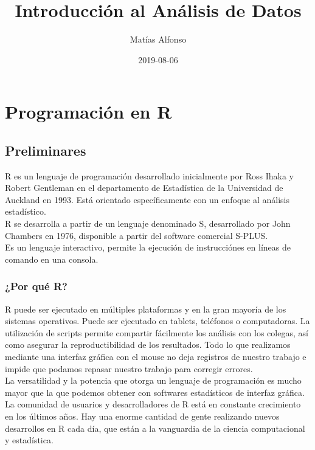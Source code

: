 \documentclass[spanish,]{book}
\title{Introducción al Análisis de Datos}
\author{Matías Alfonso}
\date{2019-08-06}
\begin{document}
\maketitle

{
\setcounter{tocdepth}{1}
\tableofcontents
}
\part{Programación en R}\label{part-programacion-en-r}

\chapter{Preliminares}\label{prelim}

R es un lenguaje de programación desarrollado inicialmente por Ross
Ihaka y Robert Gentleman en el departamento de Estadística de la
Universidad de Auckland en 1993. Está orientado específicamente con un
enfoque al análisis estadístico.\\
R se desarrolla a partir de un lenguaje denominado S, desarrollado por
John Chambers en 1976, disponible a partir del software comercial
S-PLUS.\\
Es un lenguaje interactivo, permite la ejecución de instrucciónes en
líneas de comando en una consola.

\section{¿Por qué R?}\label{por-que-r}

R puede ser ejecutado en múltiples plataformas y en la gran mayoría de
los sistemas operativos. Puede ser ejecutado en tablets, teléfonos o
computadoras. La utilización de scripts permite compartir fácilmente los
análisis con los colegas, así como asegurar la reproductibilidad de los
resultados. Todo lo que realizamos mediante una interfaz gráfica con el
mouse no deja registros de nuestro trabajo e impide que podamos repasar
nuestro trabajo para corregir errores.\\
La versatilidad y la potencia que otorga un lenguaje de programación es
mucho mayor que la que podemos obtener con softwares estadísticos de
interfaz gráfica.\\
La comunidad de usuarios y desarrolladores de R está en constante
crecimiento en los últimos años. Hay una enorme cantidad de gente
realizando nuevos desarrollos en R cada día, que están a la vanguardia
de la ciencia computacional y estadística.
\end{document}
